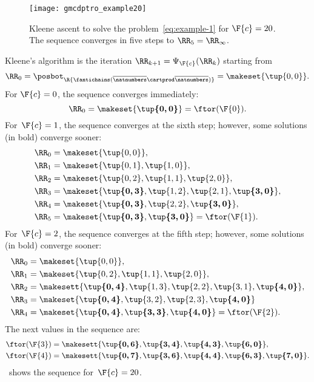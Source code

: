 \begin{figure}
    \centering
    \texttt{[image: gmcdptro\_example20]}
    \caption{
        Kleene ascent to solve the problem~\cref{eq:example-1} for $\F{c}=20$.
        The sequence converges in five steps to $\RR_{5}=\RR_{\infty}$.
    }
    \label{fig:example24}
\end{figure}
%
Kleene's algorithm is the iteration $\RR_{k+1}=\Psi_{\F{c}}(\RR_{k})$ starting from
\begin{equation}
    \RR_{0}
    =
    \posbot_{\R{\fantichains(\overline{\natnumbers}\cartprod\overline{\natnumbers})}}
    =\makeset{\tup{ 0,0} }.
\end{equation}
%
For $\F{c}=0$, the sequence converges immediately:
%
\begin{equation}
    \RR_{0}=\makeset{\boldsymbol{\tup{0,0}}}=\ftor(\F{0}).
\end{equation}
%
For~$\F{c}=1$, the sequence converges at the sixth step; however, some solutions (in bold) converge sooner:
%
\begin{align*}
    \RR_{0} & =\makeset{\tup{0,0} }, \\
    \RR_{1} & =\makeset{\tup{0,1},\tup{1,0}}, \\
    \RR_{2} & =\makeset{\tup{0,2},\tup{1,1}, \tup{2,0}}, \\
    \RR_{3} & =\makeset{\boldsymbol{\tup{0,3}},\tup{1,2}, \tup{2,1},\boldsymbol{\tup{3,0}}}, \\
    \RR_{4} & =\makeset{\boldsymbol{\tup{0,3}},\tup{2,2},\boldsymbol{\tup{3,0}}}, \\
    \RR_{5} & =\makeset{\boldsymbol{\tup{0,3}},\boldsymbol{\tup{3,0}}}=\ftor(\F{1}).
\end{align*}
%
For~$\F{c}=2$, the sequence converges at the fifth step; however, some solutions (in bold) converge sooner:
%
\begin{align*}
    \RR_{0} & =\makeset{\tup{ 0,0} }, \\
    \RR_{1} & =\makeset{\tup{ 0,2} ,\tup{ 1,1} ,\tup{ 2,0} }, \\
    \RR_{2} & =\makesett{ \boldsymbol{\tup{ 0,4} }, \tup{1,3}, \tup{2,2}, \tup{3,1}, \boldsymbol{\tup{ 4,0} }} , \\
    \RR_{3} & =\makeset{\boldsymbol{\tup{0,4} },\tup{ 3,2}, \tup{2,3}, \boldsymbol{\tup{ 4,0} }} \\
    \RR_{4} & =\makeset{\boldsymbol{\tup{0,4} },\boldsymbol{\tup{ 3,3}},\boldsymbol{\tup{ 4,0} }}=\ftor(\F{2}).
\end{align*}
%
The next values in the sequence are:
%
\begin{align*}
    \ftor(\F{3}) & =\makesett{ \boldsymbol{\tup{ 0,6} },\boldsymbol{\tup{ 3,4} },\boldsymbol{\tup{ 4,3} },\boldsymbol{\tup{ 6,0} }} , \\
    \ftor(\F{4}) & =\makesett{ \boldsymbol{\tup{ 0,7} },\boldsymbol{\tup{ 3,6} },\boldsymbol{\tup{ 4,4} },\boldsymbol{\tup{ 6,3} },\boldsymbol{\tup{ 7,0} }} .
\end{align*}
%
~shows the sequence for~$\F{c}=20$.

